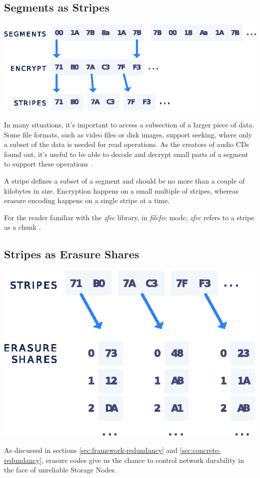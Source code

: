 \documentclass[8pt,fleqn,openany]{book}
\begin{document}
\subsection{Segments as Stripes}\label{segments-as-stripes}

\begin{center}
\includegraphics[width=.65\textwidth]{images/segment-stripe.eps}
\end{center}

In many situations, it's important to access a subsection of a larger piece of
data. Some file formats, such as video files or disk images, support seeking,
where only a subset of the data is needed for read operations.
As the creators of audio CDs found out,
it's useful to be able to decode and decrypt small parts of a segment
to support these operations \cite{rs-cd}.

A stripe defines a subset of a segment and should be no more than a
couple of kilobytes in size. Encryption happens on a small multiple of stripes,
whereas erasure encoding happens on a single stripe at a time.

For the reader familiar with the {\em zfec} library, in {\em filefec} mode,
{\em zfec} refers to a stripe as a chunk \cite{filefec-packing}.

\subsection{Stripes as Erasure Shares}\label{stripes-as-erasure-shares}

\begin{center}
\includegraphics[width=.45\textwidth]{images/stripe-share.eps}
\end{center}

As discussed in sections \ref{sec:framework-redundancy} and
\ref{sec:concrete-redundancy}, erasure codes
give us the chance to control network durability in the face
of unreliable Storage Nodes.
\end{document}

